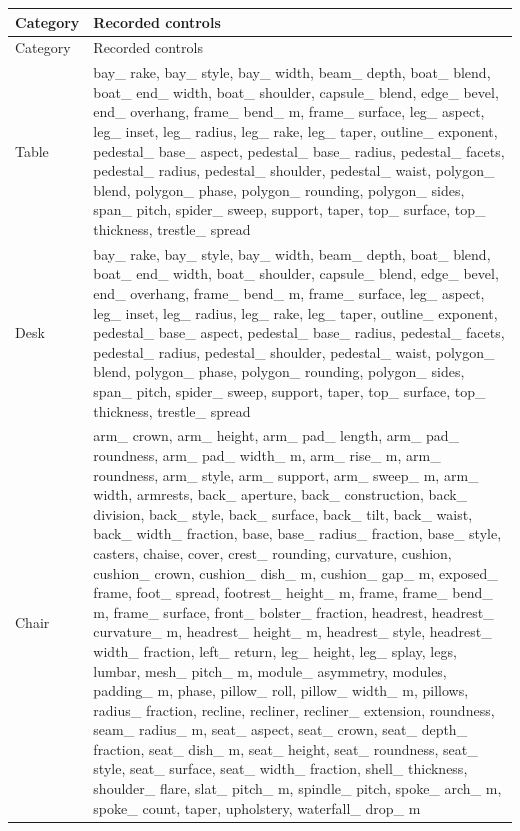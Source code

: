 \begin{longtable}{p{.20\linewidth}p{.74\linewidth}}
\toprule Category & Recorded controls \\\midrule
\endfirsthead
\toprule Category & Recorded controls \\\midrule
\endhead

Table & bay\_ rake, bay\_ style, bay\_ width, beam\_ depth, boat\_ blend, boat\_ end\_ width, boat\_ shoulder, capsule\_ blend, edge\_ bevel, end\_ overhang, frame\_ bend\_ m, frame\_ surface, leg\_ aspect, leg\_ inset, leg\_ radius, leg\_ rake, leg\_ taper, outline\_ exponent, pedestal\_ base\_ aspect, pedestal\_ base\_ radius, pedestal\_ facets, pedestal\_ radius, pedestal\_ shoulder, pedestal\_ waist, polygon\_ blend, polygon\_ phase, polygon\_ rounding, polygon\_ sides, span\_ pitch, spider\_ sweep, support, taper, top\_ surface, top\_ thickness, trestle\_ spread \\
Desk & bay\_ rake, bay\_ style, bay\_ width, beam\_ depth, boat\_ blend, boat\_ end\_ width, boat\_ shoulder, capsule\_ blend, edge\_ bevel, end\_ overhang, frame\_ bend\_ m, frame\_ surface, leg\_ aspect, leg\_ inset, leg\_ radius, leg\_ rake, leg\_ taper, outline\_ exponent, pedestal\_ base\_ aspect, pedestal\_ base\_ radius, pedestal\_ facets, pedestal\_ radius, pedestal\_ shoulder, pedestal\_ waist, polygon\_ blend, polygon\_ phase, polygon\_ rounding, polygon\_ sides, span\_ pitch, spider\_ sweep, support, taper, top\_ surface, top\_ thickness, trestle\_ spread \\
Chair & arm\_ crown, arm\_ height, arm\_ pad\_ length, arm\_ pad\_ roundness, arm\_ pad\_ width\_ m, arm\_ rise\_ m, arm\_ roundness, arm\_ style, arm\_ support, arm\_ sweep\_ m, arm\_ width, armrests, back\_ aperture, back\_ construction, back\_ division, back\_ style, back\_ surface, back\_ tilt, back\_ waist, back\_ width\_ fraction, base, base\_ radius\_ fraction, base\_ style, casters, chaise, cover, crest\_ rounding, curvature, cushion, cushion\_ crown, cushion\_ dish\_ m, cushion\_ gap\_ m, exposed\_ frame, foot\_ spread, footrest\_ height\_ m, frame, frame\_ bend\_ m, frame\_ surface, front\_ bolster\_ fraction, headrest, headrest\_ curvature\_ m, headrest\_ height\_ m, headrest\_ style, headrest\_ width\_ fraction, left\_ return, leg\_ height, leg\_ splay, legs, lumbar, mesh\_ pitch\_ m, module\_ asymmetry, modules, padding\_ m, phase, pillow\_ roll, pillow\_ width\_ m, pillows, radius\_ fraction, recline, recliner, recliner\_ extension, roundness, seam\_ radius\_ m, seat\_ aspect, seat\_ crown, seat\_ depth\_ fraction, seat\_ dish\_ m, seat\_ height, seat\_ roundness, seat\_ style, seat\_ surface, seat\_ width\_ fraction, shell\_ thickness, shoulder\_ flare, slat\_ pitch\_ m, spindle\_ pitch, spoke\_ arch\_ m, spoke\_ count, taper, upholstery, waterfall\_ drop\_ m \\

\end{longtable}
